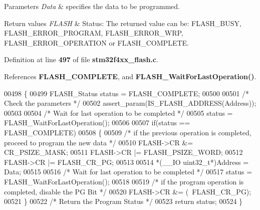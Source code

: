 \begin{DoxyParams}{Parameters}
{\em Data} & specifies the data to be programmed. \\
\hline
\end{DoxyParams}

\begin{DoxyRetVals}{Return values}
{\em F\+L\+A\+SH} & Status\+: The returned value can be\+: F\+L\+A\+S\+H\+\_\+\+B\+U\+SY, F\+L\+A\+S\+H\+\_\+\+E\+R\+R\+O\+R\+\_\+\+P\+R\+O\+G\+R\+AM, F\+L\+A\+S\+H\+\_\+\+E\+R\+R\+O\+R\+\_\+\+W\+RP, F\+L\+A\+S\+H\+\_\+\+E\+R\+R\+O\+R\+\_\+\+O\+P\+E\+R\+A\+T\+I\+ON or F\+L\+A\+S\+H\+\_\+\+C\+O\+M\+P\+L\+E\+TE. \\
\hline
\end{DoxyRetVals}


Definition at line \textbf{ 497} of file \textbf{ stm32f4xx\+\_\+flash.\+c}.



References \textbf{ F\+L\+A\+S\+H\+\_\+\+C\+O\+M\+P\+L\+E\+TE}, and \textbf{ F\+L\+A\+S\+H\+\_\+\+Wait\+For\+Last\+Operation()}.


\begin{DoxyCode}
00498 \{
00499   FLASH_Status status = FLASH_COMPLETE;
00500 
00501   \textcolor{comment}{/* Check the parameters */}
00502   assert_param(IS_FLASH_ADDRESS(Address));
00503 
00504   \textcolor{comment}{/* Wait for last operation to be completed */}
00505   status = FLASH_WaitForLastOperation();
00506   
00507   \textcolor{keywordflow}{if}(status == FLASH_COMPLETE)
00508   \{
00509     \textcolor{comment}{/* if the previous operation is completed, proceed to program the new data */}
00510     FLASH->CR &= CR_PSIZE_MASK;
00511     FLASH->CR |= FLASH_PSIZE_WORD;
00512     FLASH->CR |= FLASH_CR_PG;
00513   
00514     *(\_\_IO uint32\_t*)Address = Data;
00515         
00516     \textcolor{comment}{/* Wait for last operation to be completed */}
00517     status = FLASH_WaitForLastOperation();
00518 
00519     \textcolor{comment}{/* if the program operation is completed, disable the PG Bit */}
00520     FLASH->CR &= (~FLASH_CR_PG);
00521   \} 
00522   \textcolor{comment}{/* Return the Program Status */}
00523   \textcolor{keywordflow}{return} status;
00524 \}
\end{DoxyCode}
\mbox{\label{group__FLASH__Group2_ga4084d0184bab463a1579271bf474aaef}} 
